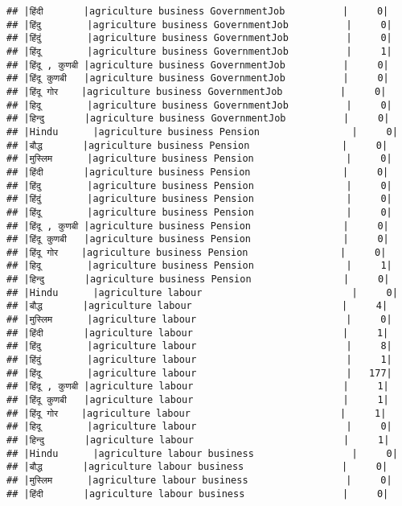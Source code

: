 \documentclass[
]{article}
\begin{document}
\begin{verbatim}
## |हिंदी       |agriculture business GovernmentJob          |     0|
## |हिंदु        |agriculture business GovernmentJob          |     0|
## |हिंदुं        |agriculture business GovernmentJob          |     0|
## |हिंदू        |agriculture business GovernmentJob          |     1|
## |हिंदू , कुणबी |agriculture business GovernmentJob          |     0|
## |हिंदू कुणबी   |agriculture business GovernmentJob          |     0|
## |हिंदू गोर    |agriculture business GovernmentJob          |     0|
## |हिदू        |agriculture business GovernmentJob          |     0|
## |हिन्दु       |agriculture business GovernmentJob          |     0|
## |Hindu      |agriculture business Pension                |     0|
## |बौद्ध       |agriculture business Pension                |     0|
## |मुस्लिम      |agriculture business Pension                |     0|
## |हिंदी       |agriculture business Pension                |     0|
## |हिंदु        |agriculture business Pension                |     0|
## |हिंदुं        |agriculture business Pension                |     0|
## |हिंदू        |agriculture business Pension                |     0|
## |हिंदू , कुणबी |agriculture business Pension                |     0|
## |हिंदू कुणबी   |agriculture business Pension                |     0|
## |हिंदू गोर    |agriculture business Pension                |     0|
## |हिदू        |agriculture business Pension                |     1|
## |हिन्दु       |agriculture business Pension                |     0|
## |Hindu      |agriculture labour                          |     0|
## |बौद्ध       |agriculture labour                          |     4|
## |मुस्लिम      |agriculture labour                          |     0|
## |हिंदी       |agriculture labour                          |     1|
## |हिंदु        |agriculture labour                          |     8|
## |हिंदुं        |agriculture labour                          |     1|
## |हिंदू        |agriculture labour                          |   177|
## |हिंदू , कुणबी |agriculture labour                          |     1|
## |हिंदू कुणबी   |agriculture labour                          |     1|
## |हिंदू गोर    |agriculture labour                          |     1|
## |हिदू        |agriculture labour                          |     0|
## |हिन्दु       |agriculture labour                          |     1|
## |Hindu      |agriculture labour business                 |     0|
## |बौद्ध       |agriculture labour business                 |     0|
## |मुस्लिम      |agriculture labour business                 |     0|
## |हिंदी       |agriculture labour business                 |     0|

\end{verbatim}
\end{document}
